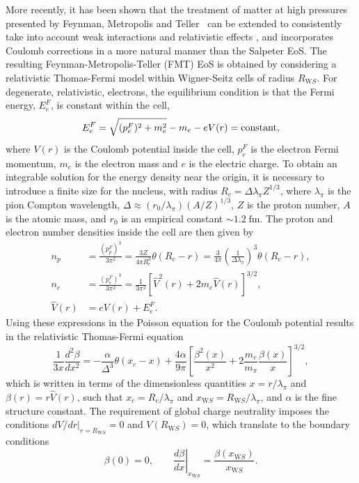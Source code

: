 More recently, it has been shown that the treatment of matter at high pressures presented by Feynman, Metropolis and Teller~\cite{Feynman:1949zz_Equationsstateelements} can be extended to consistently take into account weak interactions and relativistic effects \cite{Rotondo:2009cr_RelativisticThomasFermitreatment,Rotondo:2011zz_RelativisticFeynmanMetropolisTellertheory}, and incorporates Coulomb corrections in a more natural manner than the Salpeter EoS. The resulting Feynman-Metropolis-Teller (FMT) EoS is obtained by considering a relativistic Thomas-Fermi model within Wigner-Seitz cells of radius $R_{\mathrm WS}$. 
For degenerate, relativistic, electrons, the equilibrium condition is that the Fermi energy, $E_e^F$, is constant within the cell,
\begin{equation}\label{eq:rel_equil}
E_e^F=\sqrt{(p_e^F)^2+m_e^2}-m_e-eV(r) = \rm{constant},
\end{equation}
where $V(r)$ is the Coulomb potential inside the cell, $p_e^F$ is the electron Fermi momentum, $m_e$ is the electron mass and $e$ is the electric charge. To obtain an integrable solution for the energy density near the origin, it is necessary to introduce a finite size for the nucleus, with radius $ R_c = \Delta\lambda_{\pi} Z^{1/3}$, 
where $\lambda_\pi$ is the pion Compton wavelength, $\Delta \approx (r_0 /\lambda_\pi)(A/Z)^{1/3}$, $Z$ is the proton number, $A$ is the atomic mass, and $r_0$ is an empirical constant $\sim 1.2\;\text{fm}$. The proton and electron number densities inside the cell are then given by
\begin{align}
    n_p &=  \frac{(p^F_p)^3}{3\pi^2} =\frac{3Z}{4\pi R_c^3}\theta( R_c - r ) = \frac{3}{4\pi} \left( \frac{1}{\Delta \lambda_\pi} \right)^3 \theta(R_c -r), \label{eq:prot_dens_FMT}\\
    n_e &= \frac{(p^F_e)^3}{3\pi^2} = \frac{1}{3\pi^2}\left[ \hat{V}^2(r) + 2m_e \hat{V}(r)\right]^{3/2},\label{eq:elec_dens_FMT}\\
    \hat{V}(r) &= eV(r) + E_e^F. \label{eq:vhat}
\end{align}
Using these expressions in the Poisson equation for the Coulomb potential results in the relativistic Thomas-Fermi equation
\begin{equation}
    \frac{1}{3x}\frac{d^2\beta}{dx^2} = -\frac{\alpha}{\Delta^3}\theta(x_c -x) + \frac{4\alpha}{9\pi}\left[ \frac{\beta^2(x)}{x^2} + 2\frac{m_e}{m_\pi}\frac{\beta(x)}{x}\right]^{3/2},\label{eq:FMT_DE}
\end{equation}
which is written in terms of the dimensionless quantities $x = r/\lambda_\pi$ and $\beta(r) = r\hat{V}(r)$, such that $x_c = R_c/\lambda_\pi$ and $x_{\mathrm WS} = R_{\mathrm WS}/\lambda_\pi$, and $\alpha$ is the fine structure constant.
The requirement of global charge neutrality imposes the conditions $dV/dr |_{r=R_{\mathrm WS}} =0$ and $V(R_{\mathrm WS}) = 0$, which translate to the boundary conditions
\begin{equation}
    \beta(0) = 0, \qquad
    \left. \frac{d\beta}{dx}\right|_{x_{\mathrm WS}} = \frac{\beta(x_{\mathrm WS})}{x_{\mathrm WS}}. \label{eq:TF_bc}
\end{equation}

